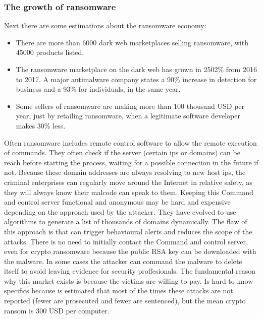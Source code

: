 \subsubsection{The growth of ransomware}
Next there are some estimations about the ransomware economy\cite{ransomware_economy}:
\begin{itemize}
	\item There are more than 6000 dark web marketplaces selling ransomware, with 45000 products listed.
	\item The ransomware marketplace on the dark web has grown in 2502\% from 2016 to 2017.
A major antimalware company states a 90\% increase in detection for business and a 93\% for individuals, in the same year\cite{ransomware_malwarebytes}.
	\item Some sellers of ransomware are making more than 100 thousand USD per year, just by retailing ransomware, when a legitimate software developer makes 30\% less.
\end{itemize}
\linej
Often ransomware includes remote control software to allow the remote execution of commands.
They often check if the server (certain ips or domains) can be reach before starting the process, waiting for a possible connection in the future if not.
Because these domain addresses are always resolving to new host ips, the criminal enterprises can regularly move around the Internet in relative safety, as they will always know their malcode can speak to them.
Keeping this Command and control server functional and anonymous may be hard and expensive depending on the approach used by the attacker.
They have evolved to use algorithms to generate a list of thousands of domains dynamically.
\linej
The flaw of this approach is that can trigger behavioural alerts and reduces the scope of the attacks.
There is no need to initially contact the Command and control server, even for crypto ransomware because the public RSA key can be downloaded with the malware.
In some cases the attacker can command the malware to delete itself to avoid leaving evidence for security proffesionals\cite{ransomware_oReilly}\cite{ransomware_digital_extortion}.
\linej
\linej
The fundamental reason why this market exists is because the victims are willing to pay.
Is hard to know specifics because is estimated that most of the times these attacks are not reported (fewer are prosecuted and fewer are sentenced), but the mean crypto ransom is 300 USD per computer\cite{ransomware_digital_extortion}.
